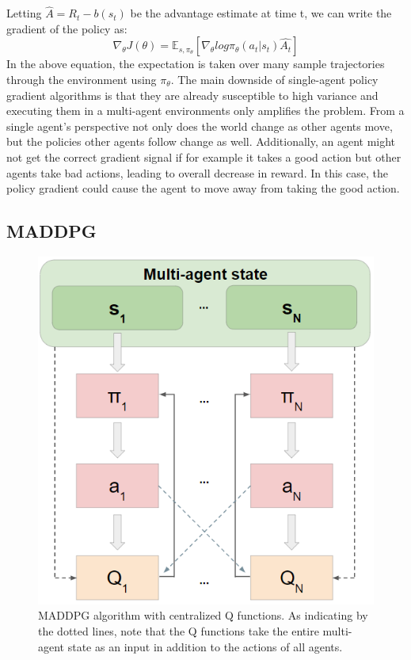 \documentclass{article}
\begin{document}
Letting $\hat{A} = R_t - b(s_t)$ be the advantage estimate at time t, we can write the gradient of the policy as:
$$\nabla_\theta J(\theta) = \mathbb{E}_{s,\pi_\theta}[\nabla_\theta log \pi_\theta(a_t|s_t)\hat{A_t}]$$
In the above equation, the expectation is taken over many sample trajectories through the environment using $\pi_\theta$. The main downside of single-agent policy gradient algorithms is that they are already susceptible to  high variance and executing them in a multi-agent environments only amplifies the problem. From a single agent's perspective not only does the world change as other agents move, but the policies other agents follow change as well. Additionally, an agent might not get the correct gradient signal if for example it takes a good action but other agents take bad actions, leading to overall decrease in reward. In this case, the policy gradient could cause the agent to move away from taking the good action.

\subsection{MADDPG}

\begin{figure}
\begin{center}
\includegraphics[scale=0.5]{maddpg-diagram}
\end{center}
\caption{MADDPG algorithm with centralized Q functions. As indicating by the dotted lines, note that the Q functions take the entire multi-agent state as an input in addition to the actions of all agents.}
\label{fig:diagram}
\end{figure}
\end{document}
